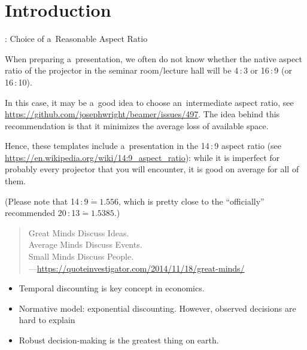 
\section{Introduction}


\begin{frame}{\titleprefix: Choice of a~Reasonable Aspect Ratio}

	When preparing a~presentation, we often do not know whether the native aspect ratio of the projector in the seminar room/lecture hall will be 4\,:\,3 or 16\,:\,9 (or 16\,:\,10).
	
	In this case, it may be a~good idea to choose an~\alert{intermediate aspect ratio}, see \url{https://github.com/josephwright/beamer/issues/497}. The idea behind this recommendation is that it minimizes the average loss of available space.
	
	Hence, these templates include a~presentation in the \alert{14\,:\,9 aspect ratio} (see \url{https://en.wikipedia.org/wiki/14:9_aspect_ratio}): while it is imperfect for probably every projector that you will encounter, it is good on average for all of them.
	
	(Please note that 14\,:\,9${}\mathrel{\dot{=}} 1.556$, which is pretty close to the ``officially'' recommended 20\,:\,13${}\mathrel{\dot{=}} 1.5385$.)

\end{frame}


\begin{frame}{\titleprefix}

\begin{quote}
	Great Minds Discuss Ideas. \\
	Average Minds Discuss Events. \\
	Small Minds Discuss People. \\
	\upshape ---\url{https://quoteinvestigator.com/2014/11/18/great-minds/}
\end{quote}

\begin{itemize}
	\item Temporal discounting is key concept in economics.
	\item Normative model: exponential discounting. However, observed decisions are hard to explain 
	\item Robust decision-making is the greatest thing on earth.
\end{itemize}

\end{frame}


